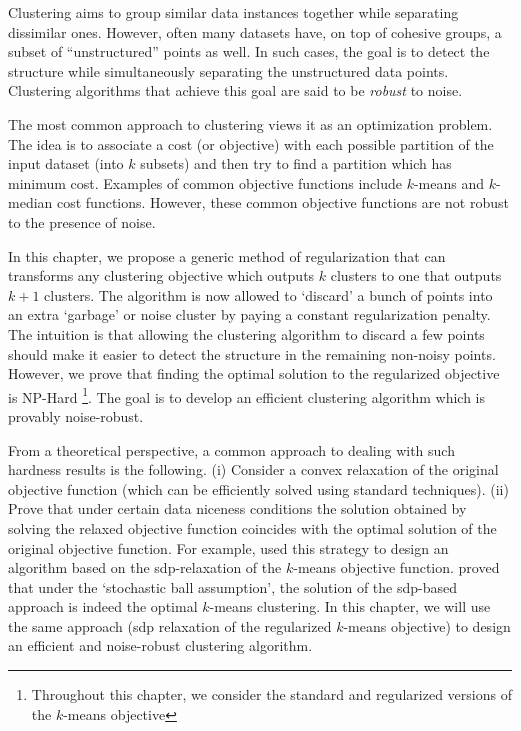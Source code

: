 \documentclass[12pt]{article}
\begin{document}
\fi

Clustering aims to group similar data instances together while separating dissimilar ones. However, often many datasets have, on top of cohesive groups, a subset of ``unstructured'' points as well. In such cases, the goal is to detect the structure while simultaneously separating the unstructured data points. Clustering algorithms that achieve this goal are said to be {\em robust} to noise.

The most common approach to clustering views it as an optimization problem. The idea is to associate a cost (or objective) with each possible partition of the input dataset (into $k$ subsets) and then try to find a partition which has minimum cost. Examples of common objective functions include $k$-means and $k$-median cost functions. However, these common objective functions are not robust to the presence of noise.   

In this chapter, we propose a generic method of regularization that can transforms any clustering objective which outputs $k$ clusters to one that outputs $k+1$ clusters. The algorithm is now allowed to `discard' a bunch of points into an extra `garbage' or noise cluster by paying a constant regularization penalty. The intuition is that allowing the clustering algorithm to discard a few points should make it easier to detect the structure in the remaining non-noisy points. However, we prove that finding the optimal solution to the regularized objective is NP-Hard \footnote{Throughout this chapter, we consider the standard and regularized versions of the $k$-means objective}. The goal is to develop an efficient clustering algorithm which is provably noise-robust.

From a theoretical perspective, a common approach to dealing with such hardness results is the following. (i) Consider a convex relaxation of the original objective function (which can be efficiently solved using standard techniques). (ii) Prove that under certain data niceness conditions the solution obtained by solving the relaxed objective function coincides with the optimal solution of the original objective function. For example, \cite{peng2007approximating} used this strategy to design an algorithm based on the sdp-relaxation of the $k$-means objective function. \cite{awasthi2015relax} proved that under the `stochastic ball assumption', the solution of the sdp-based approach is indeed the optimal $k$-means clustering. In this chapter, we will use the same approach (sdp relaxation of the regularized $k$-means objective) to design an efficient and noise-robust clustering algorithm.
\end{document}
